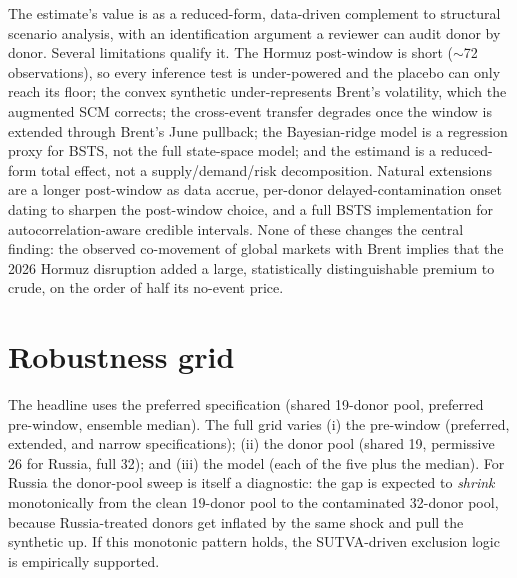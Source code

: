 \documentclass[11pt,a4paper]{article}
\begin{document}
The estimate's value is as a reduced-form, data-driven complement to structural scenario
analysis, with an identification argument a reviewer can audit donor by donor. Several
limitations qualify it. The Hormuz post-window is short ($\sim$72 observations), so every
inference test is under-powered and the placebo can only reach its floor; the convex
synthetic under-represents Brent's volatility, which the augmented SCM corrects; the
cross-event transfer degrades once the window is extended through Brent's June pullback;
the Bayesian-ridge model is a regression proxy for BSTS, not the full state-space model;
and the estimand is a reduced-form total effect, not a supply/demand/risk decomposition.
Natural extensions are a longer post-window as data accrue, per-donor
delayed-contamination onset dating to sharpen the post-window choice, and a full BSTS
implementation for autocorrelation-aware credible intervals. None of these changes the
central finding: the observed co-movement of global markets with Brent implies that the
2026 Hormuz disruption added a large, statistically distinguishable premium to crude, on
the order of half its no-event price.



\appendix
\section{Robustness grid}\label{app:grid}
The headline uses the preferred specification (shared 19-donor pool, preferred pre-window,
ensemble median). The full grid varies (i) the pre-window (preferred, extended, and narrow
specifications); (ii) the donor pool (shared 19, permissive 26 for Russia, full 32); and
(iii) the model (each of the five plus the median). For Russia the donor-pool sweep is
itself a diagnostic: the gap is expected to \emph{shrink} monotonically from the clean
19-donor pool to the contaminated 32-donor pool, because Russia-treated donors get inflated
by the same shock and pull the synthetic up. If this monotonic pattern holds, the
SUTVA-driven exclusion logic is empirically supported.

\end{document}
